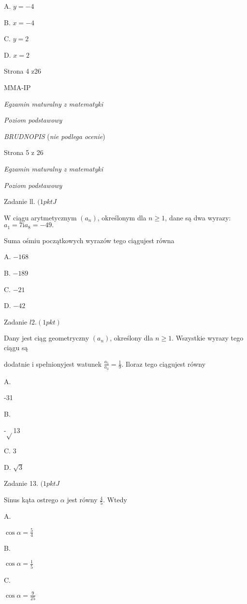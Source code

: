 \documentclass[a4paper,12pt]{article}
\begin{document}
A. $y=-4$

B. $x=-4$

C. $y=2$

D. $x=2$

Strona 4 z26

MMA-IP





{\it Egzamin maturalny z matematyki}

{\it Poziom podstawowy}

{\it BRUDNOPIS} ({\it nie podlega ocenie})

Strona 5 z 26





{\it Egzamin maturalny z matematyki}

{\it Poziom podstawowy}

Zadanie ll. $(1pktJ$

$\mathrm{W}$ ciągu arytmetycznym $(a_{n})$, określonym dla $n\geq 1$, dane są dwa wyrazy: $a_{1}=7\mathrm{i}a_{8}=-49.$

Suma ośmiu początkowych wyrazów tego ciągujest równa

A. $-168$

B. $-189$

C. $-21$

D. $-42$

Zadanie $l2. (1pkt)$

Dany jest ciąg geometryczny $(a_{n})$, określony dla $n\geq 1$. Wszystkie wyrazy tego ciągu są

dodatnie i spełnionyjest watunek $\displaystyle \frac{a_{5}}{a_{3}}=\frac{1}{9}$. Iloraz tego ciągujest równy

A.

-31

B.

-$\sqrt{}$13

C. 3

D. $\sqrt{3}$

Zadanie 13. $(1pktJ$

Sinus kąta ostrego $\alpha$ jest równy $\displaystyle \frac{4}{5}$. Wtedy

A.

$\displaystyle \cos\alpha=\frac{5}{4}$

B.

$\displaystyle \cos\alpha=\frac{1}{5}$

C.

$\displaystyle \cos\alpha=\frac{9}{25}$
\end{document}
